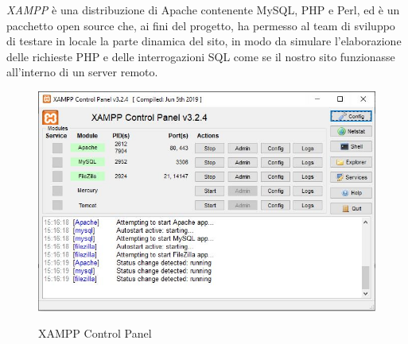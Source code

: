 ﻿\emph{XAMPP} è una distribuzione di Apache contenente MySQL, PHP e Perl, ed è un pacchetto open source che, ai fini del progetto, ha permesso
al team di sviluppo di testare in locale la parte dinamica del sito, in modo da simulare l'elaborazione delle richieste PHP e delle 
interrogazioni SQL come se il nostro sito funzionasse all'interno di un server remoto.\\
\begin{figure}[!h]
	\centering
	\includegraphics[width=0.7\linewidth]{sezioni/FaseTest/Immagini/xampp.JPG}\\
	\caption{XAMPP Control Panel}
	\label{Fig:xampp}
\end{figure} 